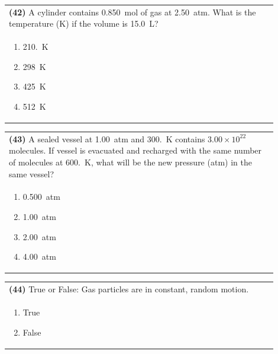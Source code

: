 \documentclass{article}
\begin{document}
\vspace{0.2cm}
\noindent\begin{tabular}{|p{0.9\linewidth}|}
\hline
\textbf{(42)} A cylinder contains 0.850~mol of gas at 2.50~atm. What is the temperature (K) if the volume is 15.0~L?\\[0.2cm]

\begin{minipage}[t]{0.85\linewidth}
\begin{enumerate}[label=\alph*.]
\item 210.~K
\item 298~K
\item 425~K
\item 512~K
\end{enumerate}
\end{minipage}\\[0.2cm]
\hline
\end{tabular}

\vspace{0.2cm}
\noindent\begin{tabular}{|p{0.9\linewidth}|}
\hline
\textbf{(43)} A sealed vessel at 1.00~atm and 300.~K contains $3.00\times10^{22}$ molecules. If vessel is evacuated and recharged with the same number of molecules at 600.~K, what will be the new pressure (atm) in the same vessel?\\[0.2cm]

\begin{minipage}[t]{0.85\linewidth}
\begin{enumerate}[label=\alph*.]
\item 0.500~atm
\item 1.00~atm
\item 2.00~atm
\item 4.00~atm
\end{enumerate}
\end{minipage}\\[0.2cm]
\hline
\end{tabular}

\vspace{0.2cm}
\noindent\begin{tabular}{|p{0.9\linewidth}|}
\hline
\textbf{(44)} True or False: Gas particles are in constant, random motion.\\[0.2cm]

\begin{minipage}[t]{0.85\linewidth}
\begin{enumerate}[label=\alph*.]
\item True
\item False
\end{enumerate}
\end{minipage}\\[0.2cm]
\hline
\end{tabular}
\end{document}
